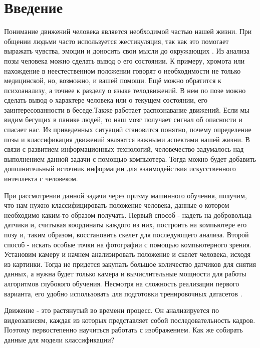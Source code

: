 \section{Введение}
\label{sec:Chapter0} 

Понимание движений человека является необходимой частью нашей жизни. При общении людьми часто используется жестикуляция, так как это помогает выражать чувства, эмоции и доносить свои мысли до окружающих . Из анализа позы человека можно сделать вывод о его состоянии. К примеру, хромота или нахождение в неестественном положении говорят о необходимости не только медицинской, но, возможно, и вашей помощи. Ещё можно обратится к психоанализу, а точнее к разделу о языке телодвижений. В нем по позе можно сделать вывод о характере человека или о текущем состоянии, его заинтересованности  в беседе.Также работает распознавание движений. Если мы видим бегущих в панике людей, то наш мозг получает сигнал об опасности и спасает нас. Из приведенных ситуаций   становится  понятно, почему определение позы и классификация движений являются важными аспектами нашей жизни. В связи с развитием информационных технологий, человечество задумалось над выполнением данной задачи с помощью компьютера. Тогда можно будет добавить дополнительный источник информации для  взаимодействия искусственного интеллекта с человеком.

При рассмотрении данной задачи через призму машинного обучения, получим, что нам нужно классифицировать положение человека, данные о котором необходимо каким-то образом получать. Первый способ - надеть на добровольца датчики и, считывая координаты каждого из них, построить на компьютере его позу и, таким образом, восстановить скелет для последующего анализа. Второй способ - искать особые точки на фотографии с помощью компьютерного зрения. Установим камеру и начнем анализировать положение и скелет человека, исходя из картинки. Тогда не придется закупать большое количество датчиков для снятия данных, а нужна будет только камера и вычислительные мощности для работы алгоритмов глубокого обучения. Несмотря на сложность реализации первого варианта, его удобно использовать для подготовки тренировочных датасетов \cite{h36m_pami}.

\hfill \break
Движение - это растянутый во времени процесс. Он анализируется по видеозаписям, каждая из которых представляет собой последовательность кадров. Поэтому первостепенно научиться работать с изображением. Как же собирать данные для модели классификации?

